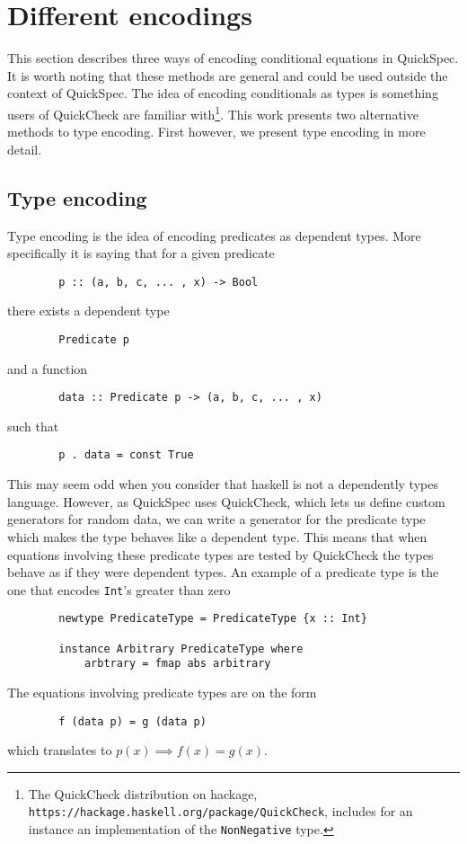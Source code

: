 \section{Different encodings}\label{encodings}

    This section describes three
    ways of encoding conditional
    equations in QuickSpec. It is
    worth noting that these methods
    are general and could be used outside
    the context of QuickSpec. The
    idea of encoding conditionals
    as types is something users of
    QuickCheck\cite{Claessen2000}
    are familiar with\footnote{The QuickCheck distribution
    on hackage, \texttt{https://hackage.haskell.org/package/QuickCheck}, includes for an instance an implementation
    of the \texttt{NonNegative} type.}. 
    This work presents two alternative methods
    to type encoding. First however, we present type encoding
    in more detail.

    \subsection{Type encoding}\label{TE}

        Type encoding is the idea of encoding
        predicates as dependent types. More specifically
        it is saying that for a given predicate
        \begin{verbatim}
        p :: (a, b, c, ... , x) -> Bool
        \end{verbatim}
        there exists a dependent type
        \begin{verbatim}
        Predicate p
        \end{verbatim}
        and a function 
        \begin{verbatim}
        data :: Predicate p -> (a, b, c, ... , x)
        \end{verbatim}
        such that 
        \begin{verbatim}
        p . data = const True
        \end{verbatim}
        This may seem odd when you consider that haskell is not a dependently types
        language. However, as QuickSpec uses QuickCheck, which lets us define
        custom generators for random data, we can write a generator for 
        the predicate type which makes the type behaves like a dependent type.
        This means that when equations involving these predicate
        types are tested by QuickCheck the types behave as if they were dependent types.
        An example of a predicate type is the one that encodes \texttt{Int}'s greater than zero
        \begin{verbatim}
        newtype PredicateType = PredicateType {x :: Int}

        instance Arbitrary PredicateType where
            arbtrary = fmap abs arbitrary
        \end{verbatim}
        The equations involving predicate types are on the form
        \begin{verbatim}
        f (data p) = g (data p)
        \end{verbatim}
        which translates to $p(x) \implies f(x) = g(x)$.

